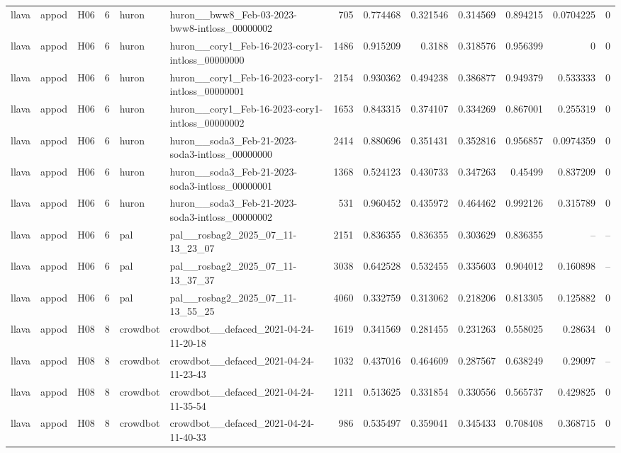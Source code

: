 \begin{longtable}{lllrllrrrrrrr}
llava & appod & H06 & 6 & huron & huron\_\_bww8\_Feb-03-2023-bww8-intloss\_00000002 & 705 & 0.774468 & 0.321546 & 0.314569 & 0.894215 & 0.0704225 & 0 \\
llava & appod & H06 & 6 & huron & huron\_\_cory1\_Feb-16-2023-cory1-intloss\_00000000 & 1486 & 0.915209 & 0.3188 & 0.318576 & 0.956399 & 0 & 0 \\
llava & appod & H06 & 6 & huron & huron\_\_cory1\_Feb-16-2023-cory1-intloss\_00000001 & 2154 & 0.930362 & 0.494238 & 0.386877 & 0.949379 & 0.533333 & 0 \\
llava & appod & H06 & 6 & huron & huron\_\_cory1\_Feb-16-2023-cory1-intloss\_00000002 & 1653 & 0.843315 & 0.374107 & 0.334269 & 0.867001 & 0.255319 & 0 \\
llava & appod & H06 & 6 & huron & huron\_\_soda3\_Feb-21-2023-soda3-intloss\_00000000 & 2414 & 0.880696 & 0.351431 & 0.352816 & 0.956857 & 0.0974359 & 0 \\
llava & appod & H06 & 6 & huron & huron\_\_soda3\_Feb-21-2023-soda3-intloss\_00000001 & 1368 & 0.524123 & 0.430733 & 0.347263 & 0.45499 & 0.837209 & 0 \\
llava & appod & H06 & 6 & huron & huron\_\_soda3\_Feb-21-2023-soda3-intloss\_00000002 & 531 & 0.960452 & 0.435972 & 0.464462 & 0.992126 & 0.315789 & 0 \\
llava & appod & H06 & 6 & pal & pal\_\_rosbag2\_2025\_07\_11-13\_23\_07 & 2151 & 0.836355 & 0.836355 & 0.303629 & 0.836355 & -- & -- \\
llava & appod & H06 & 6 & pal & pal\_\_rosbag2\_2025\_07\_11-13\_37\_37 & 3038 & 0.642528 & 0.532455 & 0.335603 & 0.904012 & 0.160898 & -- \\
llava & appod & H06 & 6 & pal & pal\_\_rosbag2\_2025\_07\_11-13\_55\_25 & 4060 & 0.332759 & 0.313062 & 0.218206 & 0.813305 & 0.125882 & 0 \\
llava & appod & H08 & 8 & crowdbot & crowdbot\_\_defaced\_2021-04-24-11-20-18 & 1619 & 0.341569 & 0.281455 & 0.231263 & 0.558025 & 0.28634 & 0 \\
llava & appod & H08 & 8 & crowdbot & crowdbot\_\_defaced\_2021-04-24-11-23-43 & 1032 & 0.437016 & 0.464609 & 0.287567 & 0.638249 & 0.29097 & -- \\
llava & appod & H08 & 8 & crowdbot & crowdbot\_\_defaced\_2021-04-24-11-35-54 & 1211 & 0.513625 & 0.331854 & 0.330556 & 0.565737 & 0.429825 & 0 \\
llava & appod & H08 & 8 & crowdbot & crowdbot\_\_defaced\_2021-04-24-11-40-33 & 986 & 0.535497 & 0.359041 & 0.345433 & 0.708408 & 0.368715 & 0 \\

\end{longtable}
